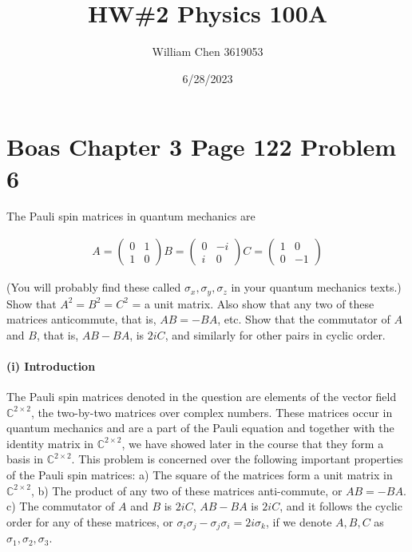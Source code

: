 \documentclass{article}
\title{HW\#2 Physics 100A}
\date{6/28/2023}
\author{William Chen 3619053}
\begin{document}
\maketitle
 
\section*{Boas Chapter 3 Page 122 Problem 6}

The Pauli spin matrices in quantum mechanics are

\begin{align*}
A = \begin{pmatrix}
0 & 1 \\ 1 & 0
\end{pmatrix}
B = \begin{pmatrix}
0 & -i \\ i & 0
\end{pmatrix}
C = \begin{pmatrix}
1 & 0 \\ 0 & -1
\end{pmatrix}
\end{align*}

(You will probably find these called $\sigma_x, \sigma_y, \sigma_z$ in your quantum mechanics texts.)
Show that $A^2 = B^2 = C^2$ = a unit matrix. Also show that any two of these matrices
anticommute, that is, $AB = -BA$, etc. Show that the commutator of $A$ and $B$, that
is, $AB - BA$, is $2iC$, and similarly for other pairs in cyclic order.

\paragraph{(i) Introduction} The Pauli spin matrices denoted in the question are elements of the vector field $\mathbb{C}^{2\times 2}$, the two-by-two matrices over complex numbers. These matrices occur in quantum mechanics and are a part of the Pauli equation and together with the identity matrix in $\mathbb{C}^{2\times 2}$, we have showed later in the course that they form a basis in $\mathbb{C}^{2\times 2}$. This problem is concerned over the following important properties of the Pauli spin matrices: a) The square of the matrices form a unit matrix in $\mathbb{C}^{2 \times 2}$, b) The product of any two of these matrices anti-commute, or $AB = -BA$. c) The commutator of $A$ and $B$ is $2iC$, $AB - BA$ is $2iC$, and it follows the cyclic order for any of these matrices, or $\sigma_i \sigma_j - \sigma_j \sigma_i = 2i\sigma_k$, if we denote $A, B, C$ as $\sigma_1, \sigma_2, \sigma_3$. 
\end{document}
